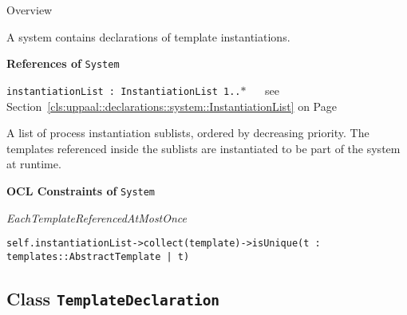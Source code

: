 	\begin{longdescription}
		\item[Overview] 		
				

	

		A system contains declarations of template instantiations.		
		
	
			\item[\textbf{References of} \texttt{System}] ~
			\begin{longdescription}
	\item[\texttt{instantiationList : InstantiationList 	\symbol{"5B}1..$*$\symbol{"5D}
}] ~
	see Section~\ref{cls:uppaal::declarations::system::InstantiationList} on Page~\pageref{cls:uppaal::declarations::system::InstantiationList}
	
	\nopagebreak
		
				

	

		A list of process instantiation sublists, ordered by decreasing priority. The templates referenced inside the sublists are instantiated to be part of the system at runtime.		
			\end{longdescription}
			\item[\textbf{OCL Constraints of} \texttt{System}] ~
			\begin{longdescription}
	\item[\small\textit{EachTemplateReferencedAtMostOnce}] ~ 
	\nopagebreak
	
		\begin{lstlisting}[breaklines=true]
self.instantiationList->collect(template)->isUnique(t : templates::AbstractTemplate | t)		\end{lstlisting}
			\end{longdescription}
	
	\end{longdescription}
	

\subsection{Class \bfseries \texttt{TemplateDeclaration}\normalfont}
\label{cls:uppaal::declarations::system::TemplateDeclaration} 
	
